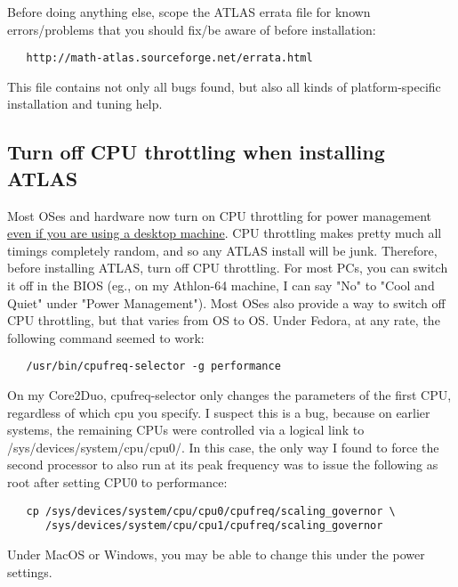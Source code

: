\documentclass[11pt]{article}
\begin{document}
Before doing anything else, scope the ATLAS errata file for known 
errors/problems that you should fix/be aware of before installation:
\vspace*{-0.1in}
\begin{verbatim}
   http://math-atlas.sourceforge.net/errata.html
\end{verbatim}

This file contains not only all bugs found, but also all kinds
of platform-specific installation and tuning help.

\subsection{Turn off CPU throttling when installing ATLAS}
Most OSes and hardware now turn on CPU throttling for power management\\
\underline{even if you are using a desktop machine}.  CPU throttling makes
pretty much all timings completely random, and so any ATLAS install will be
junk.  Therefore, before installing ATLAS, turn off CPU throttling.  For most
PCs, you can switch it off in the BIOS (eg., on my Athlon-64 machine, I can say
"No" to "Cool and Quiet" under "Power Management").  Most OSes also provide a
way to switch off CPU throttling, but that varies from OS to OS.  Under
Fedora, at any rate, the following command seemed to work:
\begin{verbatim}
   /usr/bin/cpufreq-selector -g performance 
\end{verbatim}

On my Core2Duo, cpufreq-selector only
changes the parameters of the first CPU, regardless of which cpu you specify.
I suspect this is a bug, because on earlier systems, the remaining CPUs were
controlled via a logical link to /sys/devices/system/cpu/cpu0/.  In this case,
the only way I found to force the second processor to also run at its peak
frequency was to issue the following as root after setting CPU0 to performance:
\begin{verbatim} 
   cp /sys/devices/system/cpu/cpu0/cpufreq/scaling_governor \
      /sys/devices/system/cpu/cpu1/cpufreq/scaling_governor 
\end{verbatim}
Under MacOS or Windows,
you may be able to change this under the power settings.

\end{document}
